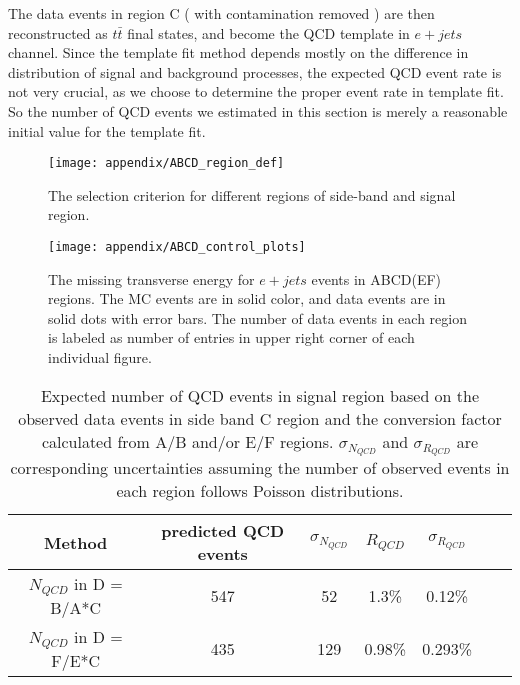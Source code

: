 The data events in region C ( with contamination removed ) are then reconstructed as $t\bar{t}$ final states, and become the QCD template in $e+jets$ channel. Since the template fit method depends mostly on the difference in distribution of signal and background processes, the expected QCD event rate is not very crucial, as we choose to determine the proper event rate in template fit. So the number of QCD events we estimated in this section is merely a reasonable initial value for the template fit. 

\begin{figure}[hbt]
	\begin{center}
		\texttt{[image: appendix/ABCD\_region\_def]}
		\caption{\small The selection criterion for different regions of side-band and signal region.}
		\label{fig:ABCD-def}
	\end{center}
\end{figure}

\begin{figure}[hbt]
	\begin{center}
		\texttt{[image: appendix/ABCD\_control\_plots]}
		\caption{\small The missing transverse energy for $e+jets$ events in ABCD(EF) regions. The MC events are in solid color, and data events are in solid dots with error bars. The number of data events in each region is labeled as number of entries in upper right corner of each individual figure. }
		\label{fig:ABCD-MET}
	\end{center}
\end{figure}

\begin{table}[htb]
	\centering
	\begin{tabular}{c|cc|cccc}
		Method & predicted QCD events  &  $\sigma_{N_{QCD}}$ & $R_{QCD}$ & $\sigma_{R_{QCD}}$ \\
		\hline
		$N_{QCD}$ in D = B/A*C      &  547 &   52 &          1.3\% &         0.12\%  \\
		$N_{QCD}$ in D = F/E*C      &  435 &   129 &          0.98\% &         0.293\%  \\
		\hline
	\end{tabular}
	\caption{Expected number of QCD events in signal region based on the observed data events in side band C region and the conversion factor calculated from A/B and/or E/F regions. $\sigma_{N_{QCD}}$ and $\sigma_{R_{QCD}}$ are corresponding uncertainties assuming the number of observed events in each region follows Poisson distributions. }
	\label{tab:ABCD - QCD numbers}
\end{table}


